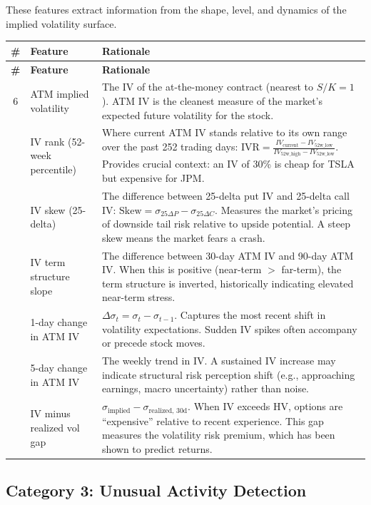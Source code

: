 \documentclass[11pt,a4paper]{article}
\begin{document}
These features extract information from the shape, level, and dynamics of the implied volatility surface.

\begin{longtable}{@{}cp{3cm}p{8cm}@{}}
\toprule
\textbf{\#} & \textbf{Feature} & \textbf{Rationale} \\
\midrule
\endfirsthead
\toprule
\textbf{\#} & \textbf{Feature} & \textbf{Rationale} \\
\midrule
\endhead
6 & ATM implied volatility & The IV of the at-the-money contract (nearest to $S/K = 1$). ATM IV is the cleanest measure of the market's expected future volatility for the stock. \\
\addlinespace
7 & IV rank (52-week percentile) & Where current ATM IV stands relative to its own range over the past 252 trading days: $\text{IVR} = \frac{IV_{\text{current}} - IV_{\text{52w\_low}}}{IV_{\text{52w\_high}} - IV_{\text{52w\_low}}}$. Provides crucial context: an IV of 30\% is cheap for TSLA but expensive for JPM. \\
\addlinespace
8 & IV skew (25-delta) & The difference between 25-delta put IV and 25-delta call IV: $\text{Skew} = \sigma_{25\Delta P} - \sigma_{25\Delta C}$. Measures the market's pricing of downside tail risk relative to upside potential. A steep skew means the market fears a crash. \\
\addlinespace
9 & IV term structure slope & The difference between 30-day ATM IV and 90-day ATM IV. When this is positive (near-term $>$ far-term), the term structure is inverted, historically indicating elevated near-term stress. \\
\addlinespace
10 & 1-day change in ATM IV & $\Delta \sigma_t = \sigma_t - \sigma_{t-1}$. Captures the most recent shift in volatility expectations. Sudden IV spikes often accompany or precede stock moves. \\
\addlinespace
11 & 5-day change in ATM IV & The weekly trend in IV. A sustained IV increase may indicate structural risk perception shift (e.g., approaching earnings, macro uncertainty) rather than noise. \\
\addlinespace
12 & IV minus realized vol gap & $\sigma_{\text{implied}} - \sigma_{\text{realized, 30d}}$. When IV exceeds HV, options are ``expensive'' relative to recent experience. This gap measures the volatility risk premium, which has been shown to predict returns. \\
\bottomrule
\end{longtable}

\subsection{Category 3: Unusual Activity Detection}
\end{document}

